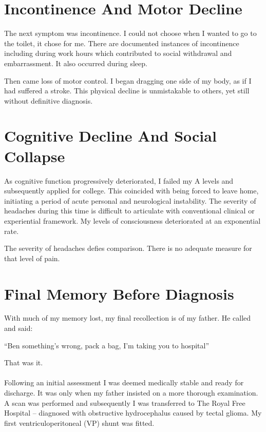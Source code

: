 \documentclass{article}
\begin{document}
\section*{Incontinence And Motor Decline}
The next symptom was incontinence. I could not choose when I wanted to go to the toilet, it chose for me. There are documented instances of incontinence including during work hours which contributed to social withdrawal and embarrassment. It also occurred during sleep.

Then came loss of motor control. I began dragging one side of my body, as if I had suffered a stroke. This physical decline is unmistakable to others, yet still without definitive diagnosis.

\section*{Cognitive Decline And Social Collapse}
As cognitive function progressively deteriorated, I failed my A levels and subsequently applied for college. This coincided with being forced to leave home, initiating a period of acute personal and neurological instability. The severity of headaches during this time is difficult to articulate with conventional clinical or experiential framework. My levels of consciousness deteriorated at an exponential rate.
\begin{center}
The severity of headaches defies comparison. There is no adequate measure for that level of pain.
\end{center}

\section*{Final Memory Before Diagnosis}
With much of my memory lost, my final recollection is of my father. He called and said:
\begin{center}
    “Ben something’s wrong, pack a bag, I’m taking you to hospital”
\end{center}

\noindent That was it.\\
\\
Following an initial assessment I was deemed medically stable and ready for discharge. It was only when my father insisted on a more thorough examination. A scan was performed and subsequently I was transferred to The Royal Free Hospital – diagnosed with obstructive hydrocephalus caused by tectal glioma. My first ventriculoperitoneal (VP) shunt was fitted.
\end{document}
